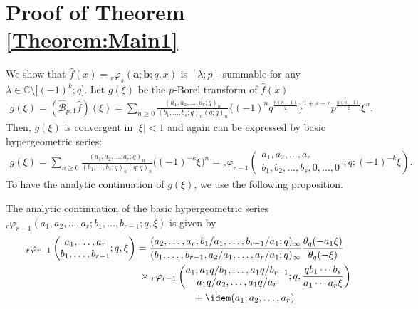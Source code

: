 \section{Proof of Theorem \ref{Theorem:Main1}}\label{Section:Proof_Main1}
We show that $\hat{f}(x)={}_r\varphi_s(\bm{a};\bm{b};q,x)$ is $[\lambda;p]$-summable for any $\lambda\in\mathbb{C}\setminus\big[(-1)^k;q\big]$. Let $g(\xi)$ be the $p$-Borel transform of $\hat{f}(x)$
\begin{gather*}
g(\xi)=(\hat{\mathcal{B}}_{p;1}\hat{f})(\xi)=\sum_{n\ge0}\frac{(a_1,a_2,\ldots,a_r;q)_n}{(b_1,\ldots,b_s;q)_n(q;q)_n}\big\{(-1)^nq^{\frac{n(n-1)}{2}}\big\}^{1+s-r}p^{\frac{n(n-1)}{2}}\xi^n.
\end{gather*}
Then, $g(\xi)$ is convergent in $|\xi|<1$ and again can be expressed by basic hypergeometric series:
\begin{gather*}
g(\xi)=\sum_{n\ge0}\frac{(a_1,a_2,\ldots,a_r;q)_n}{(b_1,\ldots,b_s;q)_n(q;q)_n}\big((-1)^{-k}\xi\big)^n={}_r\varphi_{r-1}\left(
\begin{matrix}
a_1,a_2,\ldots,a_r\\
b_1,b_2,\ldots,b_s,0,\ldots,0
\end{matrix}
;q;(-1)^{-k}\xi
\right).
\end{gather*}
To have the analytic continuation of $g(\xi)$, we use the following proposition.
\begin{Proposition} The analytic continuation of the basic hypergeometric series ${}_r\varphi_{r-1}(a_1,a_2,\ldots,a_r;b_1,\ldots,b_{r-1};q,\xi)$ is given by
\begin{gather}
{}_r\varphi_{r-1}\left(
\begin{matrix}a_1,\ldots,a_r\\
b_1,\ldots,b_{r-1}
\end{matrix};q,\xi\right)=\frac{(a_2,\ldots,a_r,b_1/a_1,\ldots,b_{r-1}/a_1;q)_\infty}{(b_1,\ldots,b_{r-1},a_2/a_1,\ldots,a_r/a_1;q)_\infty}\frac{\theta_q(-a_1\xi)}{\theta_q(-\xi)}\nonumber\\
\hphantom{{}_r\varphi_{r-1}\left(
\begin{matrix}a_1,\ldots,a_r\\
b_1,\ldots,b_{r-1}
\end{matrix};q,\xi\right)=}{} \times{}_r\varphi_{r-1}\left(
\begin{matrix}a_1,a_1q/b_1,\ldots,a_1q/b_{r-1}\\
a_1q/a_2,\ldots,a_1q/a_r
\end{matrix};q,\frac{qb_1\cdots b_{s}}{a_1\cdots a_r\xi }\right)\nonumber\\
\hphantom{{}_r\varphi_{r-1}\left(
\begin{matrix}a_1,\ldots,a_r\\
b_1,\ldots,b_{r-1}
\end{matrix};q,\xi\right)=}{} +\idem(a_1;a_2,\ldots,a_r).\label{r,r-1AC}
\end{gather}
\end{Proposition}
